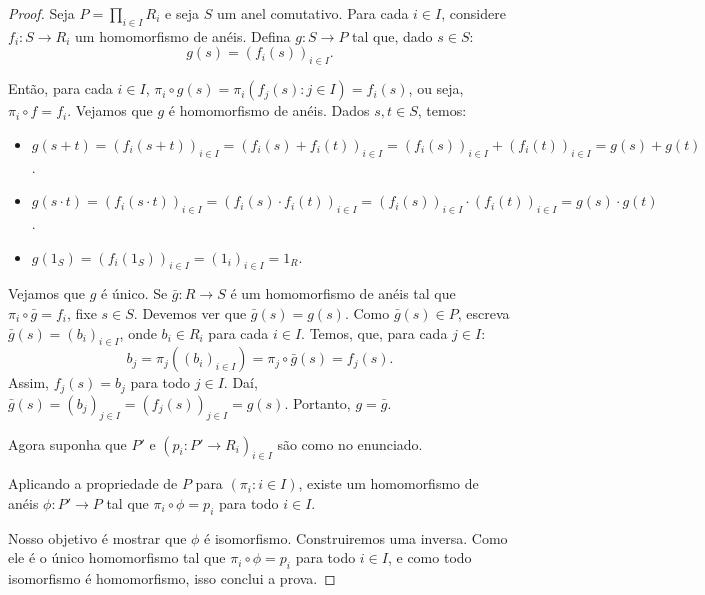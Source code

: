 \begin{proof}
    Seja $P=\prod_{i \in I}R_i$ e seja $S$ um anel comutativo. Para cada $i \in I$, considere $f_i:S\rightarrow R_i$ um homomorfismo de anéis.
    Defina $g:S\rightarrow P$ tal que, dado $s \in S$:
    \[g(s)=(f_i(s))_{i \in I}.\]

    Então, para cada $i \in I$, $\pi_i\circ g(s)=\pi_i(f_j(s): j \in I)=f_i(s)$, ou seja, $\pi_i\circ f=f_i$.
    Vejamos que $g$ é homomorfismo de anéis.
    Dados $s, t \in S$, temos:
    \begin{itemize}
        \item $g(s+t)=(f_i(s+t))_{i \in I}=(f_i(s)+f_i(t))_{i \in I}=(f_i(s))_{i \in I}+(f_i(t))_{i \in I}=g(s)+g(t)$.
        \item $g(s\cdot t)=(f_i(s\cdot t))_{i \in I}=(f_i(s)\cdot f_i(t))_{i \in I}=(f_i(s))_{i \in I}\cdot (f_i(t))_{i \in I}=g(s)\cdot g(t)$.
        \item $g(1_S)=(f_i(1_S))_{i \in I}=(1_i)_{i \in I}=1_R$.  
    \end{itemize}

    Vejamos que $g$ é único.
    Se $\bar g:R\rightarrow S$ é um homomorfismo de anéis tal que $\pi_i\circ \bar g=f_i$, fixe $s \in S$.
    Devemos ver que $\bar g(s)=g(s)$.
    Como $\bar g(s) \in P$, escreva $\bar g(s)=(b_i)_{i \in I}$, onde $b_i \in R_i$ para cada $i \in I$. Temos, que, para cada $j \in I$:
    \[b_j=\pi_j((b_i)_{i \in I})=\pi_j\circ \bar g(s)=f_j(s).\]
    Assim, $f_j(s)=b_j$ para todo $j \in I$. Daí, $\bar g(s)=(b_j)_{j \in I}=(f_j(s))_{j \in I}=g(s)$.
    Portanto, $g=\bar g$.

    Agora suponha que $P'$ e $(p_i:P'\rightarrow R_i)_{i \in I}$ são como no enunciado.

    Aplicando a propriedade de $P$ para $(\pi_i: i \in I)$, existe um homomorfismo de anéis $\phi: P'\rightarrow P$ tal que $\pi_i\circ \phi=p_i$ para todo $i \in I$.  

    \begin{figure}[H]
        \centering
    \end{figure}

    Nosso objetivo é mostrar que $\phi$ é isomorfismo.
    Construiremos uma inversa.
    Como ele é o único homomorfismo tal que $\pi_i\circ \phi=p_i$ para todo $i \in I$, e como todo isomorfismo é homomorfismo, isso conclui a prova.


\end{proof}
